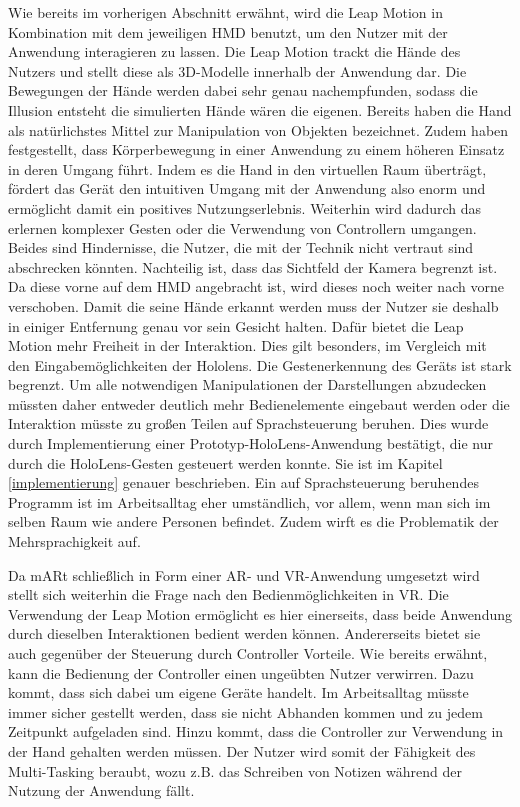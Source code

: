 Wie bereits im vorherigen Abschnitt erwähnt, wird die Leap Motion in Kombination mit dem jeweiligen HMD benutzt, um den Nutzer mit der Anwendung interagieren zu lassen. 
Die Leap Motion trackt die Hände des Nutzers und stellt diese als 3D-Modelle innerhalb der Anwendung dar. Die Bewegungen der Hände werden dabei sehr genau nachempfunden, sodass die Illusion entsteht die simulierten Hände wären die eigenen. 
Bereits \citet{Zimmerman86} haben die Hand als natürlichstes Mittel zur Manipulation von Objekten bezeichnet. Zudem haben \citet{Bianchi-Berthouze07} festgestellt, dass Körperbewegung in einer Anwendung zu einem höheren Einsatz in deren Umgang führt. Indem es die Hand in den virtuellen Raum überträgt, fördert das Gerät den intuitiven Umgang mit der Anwendung also enorm und ermöglicht damit ein positives Nutzungserlebnis. Weiterhin wird dadurch das erlernen komplexer Gesten oder die Verwendung von Controllern umgangen. Beides sind Hindernisse, die Nutzer, die mit der Technik nicht vertraut sind abschrecken könnten. 
Nachteilig ist, dass das Sichtfeld der Kamera begrenzt ist. Da diese vorne auf dem HMD angebracht ist, wird dieses noch weiter nach vorne verschoben. Damit die seine Hände erkannt werden muss der Nutzer sie deshalb in einiger Entfernung genau vor sein Gesicht halten. 
Dafür bietet die Leap Motion mehr Freiheit in der Interaktion. Dies gilt besonders, im Vergleich mit den Eingabemöglichkeiten der Hololens. 
Die Gestenerkennung des Geräts ist stark begrenzt. Um alle notwendigen Manipulationen der Darstellungen abzudecken müssten daher entweder deutlich mehr Bedienelemente eingebaut werden oder die Interaktion müsste zu großen Teilen auf Sprachsteuerung beruhen. 
Dies wurde durch Implementierung einer Prototyp-HoloLens-Anwendung bestätigt, die nur durch die HoloLens-Gesten gesteuert werden konnte. Sie ist im Kapitel \ref{implementierung} genauer beschrieben.
Ein auf Sprachsteuerung beruhendes Programm ist im Arbeitsalltag eher umständlich, vor allem, wenn man sich im selben Raum wie andere Personen befindet. Zudem wirft es die Problematik der Mehrsprachigkeit auf. 

Da mARt schließlich in Form einer AR- und VR-Anwendung umgesetzt wird stellt sich weiterhin die Frage nach den Bedienmöglichkeiten in VR. Die Verwendung der Leap Motion ermöglicht es hier einerseits, dass beide Anwendung durch dieselben Interaktionen bedient werden können. Andererseits bietet sie auch gegenüber der Steuerung durch Controller Vorteile. 
Wie bereits erwähnt, kann die Bedienung der Controller einen ungeübten Nutzer verwirren. Dazu kommt, dass sich dabei um eigene Geräte handelt. Im Arbeitsalltag müsste immer sicher gestellt werden, dass sie nicht Abhanden kommen und zu jedem Zeitpunkt aufgeladen sind. 
Hinzu kommt, dass die Controller zur Verwendung in der Hand gehalten werden müssen. Der Nutzer wird somit der Fähigkeit des Multi-Tasking beraubt, wozu z.B. das Schreiben von Notizen während der Nutzung der Anwendung fällt. 

